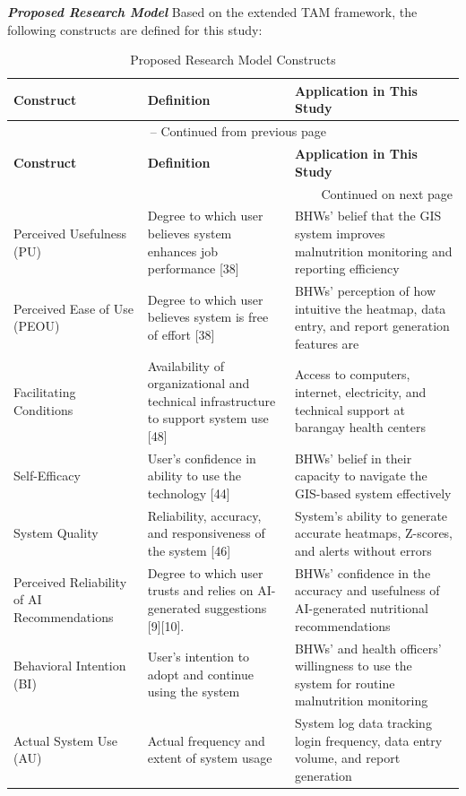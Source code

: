 \documentclass[12pt, a4paper]{report}
\begin{document}
\noindent \textbf{\textit{Proposed Research Model}}
Based on the extended TAM framework, the following constructs are defined for this study:

\vspace{0.3cm}
\begin{longtable}{p{3.5cm} p{5cm} p{5.5cm}}
    \caption{Proposed Research Model Constructs} \label{tab:research_model} \\
    \toprule
    \textbf{Construct} & \textbf{Definition} & \textbf{Application in This Study} \\
    \midrule
    \endfirsthead
    \multicolumn{3}{c}{{\tablename\ \thetable{} -- Continued from previous page}} \\
    \toprule
    \textbf{Construct} & \textbf{Definition} & \textbf{Application in This Study} \\
    \midrule
    \endhead
    \midrule
    \multicolumn{3}{r}{{Continued on next page}} \\
    \endfoot
    \bottomrule
    \endlastfoot
    Perceived Usefulness (PU) & Degree to which user believes system enhances job performance [38] & BHWs' belief that the GIS system improves malnutrition monitoring and reporting efficiency \\
    \addlinespace
    Perceived Ease of Use (PEOU) & Degree to which user believes system is free of effort [38] & BHWs' perception of how intuitive the heatmap, data entry, and report generation features are \\
    \addlinespace
    Facilitating Conditions & Availability of organizational and technical infrastructure to support system use [48] & Access to computers, internet, electricity, and technical support at barangay health centers \\
    \addlinespace
    Self-Efficacy & User's confidence in ability to use the technology [44] & BHWs' belief in their capacity to navigate the GIS-based system effectively \\
    \addlinespace
    System Quality & Reliability, accuracy, and responsiveness of the system [46] & System's ability to generate accurate heatmaps, Z-scores, and alerts without errors \\
    \addlinespace
    Perceived Reliability of AI Recommendations & Degree to which user trusts and relies on AI-generated suggestions [9][10]. & BHWs' confidence in the accuracy and usefulness of AI-generated nutritional recommendations \\
    \addlinespace
    Behavioral Intention (BI) & User's intention to adopt and continue using the system & BHWs' and health officers' willingness to use the system for routine malnutrition monitoring \\
    \addlinespace
    Actual System Use (AU) & Actual frequency and extent of system usage & System log data tracking login frequency, data entry volume, and report generation \\
\end{longtable}
\end{document}
